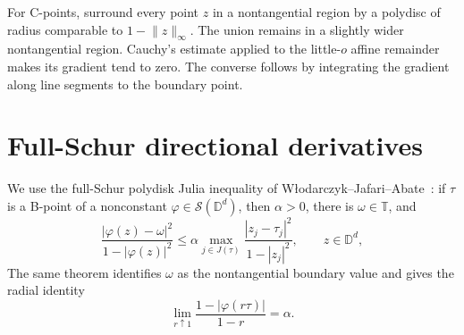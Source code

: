 \documentclass[11pt]{article}
\theoremstyle{definition}
\theoremstyle{remark}
\newcommand{\D}{\mathbb D}
\newcommand{\T}{\mathbb T}
\newcommand{\norm}[1]{\lVert #1\rVert_\infty}
\newcommand{\Schur}{\mathcal S}
\begin{document}
For C-points, surround every point \(z\) in a nontangential region by a polydisc of radius comparable to \(1-\norm z\).  The union remains in a slightly wider nontangential region.  Cauchy's estimate applied to the little-\(o\) affine remainder makes its gradient tend to zero.  The converse follows by integrating the gradient along line segments to the boundary point.

\section{Full-Schur directional derivatives}

We use the full-Schur polydisk Julia inequality of W\l odarczyk--Jafari--Abate~\cite{Abate,AMY}: if \(\tau\) is a B-point of a nonconstant \(\varphi\in\Schur(\D^d)\), then \(\alpha>0\), there is \(\omega\in\T\), and
\begin{equation}
 \frac{|\varphi(z)-\omega|^2}{1-|\varphi(z)|^2}
 \le \alpha\max_{j\in J(\tau)}
 \frac{|z_j-\tau_j|^2}{1-|z_j|^2},
 \qquad z\in\D^d,
 \label{eq:julia}
\end{equation}
The same theorem identifies \(\omega\) as the nontangential boundary value and gives the radial identity
\begin{equation}
 \lim_{r\uparrow1}\frac{1-|\varphi(r\tau)|}{1-r}=\alpha.
 \label{eq:radial}
\end{equation}
\end{document}
